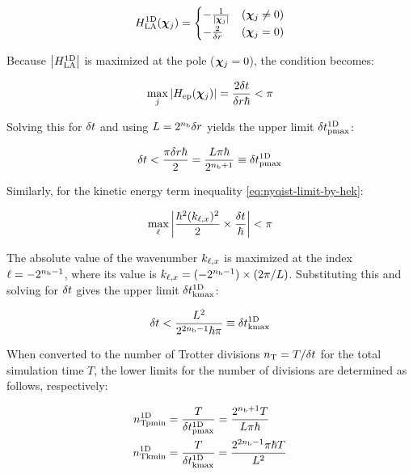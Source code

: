 \documentclass[report_2025.tex]{subfiles}
\begin{document}
\begin{equation}
H_{\mathrm{LA}}^{\mathrm{1D}}(\bm{\chi}_{j}) = \begin{cases}
-\frac{1}{{\left| \bm{\chi}_{j} \right|}} & (\bm{\chi}_{j}\neq0) \\
-\frac{2}{\delta r} & (\bm{\chi}_{j}=0)
\end{cases}
\end{equation}

Because ${\left| H_{\mathrm{LA}}^{\mathrm{1D}} \right|}$ is maximized at the pole ($\bm{\chi}_{j}=0$), the condition becomes:

\begin{equation}
\max_{j}{\left| H_{\mathrm{ep}}(\bm{\chi}_{j}) \right|} = \frac{2\delta t}{\delta r\hbar}<\pi
\end{equation}

Solving this for $\delta t$ and using $L=2^{n_{\mathrm{b}}}\delta r$ yields the upper limit $\delta t_{\mathrm{pmax}}^{\mathrm{1D}}$:

\begin{equation}
\delta t < \frac{\pi\delta r\hbar}{2}=\frac{L\pi\hbar}{2^{n_{\mathrm{b}}+1}}\equiv\delta t_{\mathrm{pmax}}^{\mathrm{1D}}
 \label{eq:nyqist-limit-by-hep-final}
\end{equation}

Similarly, for the kinetic energy term inequality \eqref{eq:nyqist-limit-by-hek}:

\begin{equation}
\max_{\ell}{\left| \frac{\hbar^2(k_{\ell,x})^2}{2}\times\frac{\delta t}{\hbar} \right|} < \pi
\label{eq:nyqist-limit-by-hek-maximum}
\end{equation}

The absolute value of the wavenumber $k_{\ell,x}$ is maximized at the index $\ell =
-2^{n_{\mathrm{b}}-1}$, where its value is $k_{\ell,x} = (-2^{n_{\mathrm{b}}-1})\times(2\pi/L)$.
Substituting this and solving for $\delta t$ gives the upper limit
$\delta t_{\mathrm{kmax}}^{\mathrm{1D}}$:

\begin{equation}
\delta t < \frac{L^2}{2^{2n_{\mathrm{b}}-1}\hbar\pi}\equiv\delta t_{\mathrm{kmax}}^{\mathrm{1D}}
 \label{eq:nyqist-limit-by-hek-final}
\end{equation}

When converted to the number of Trotter divisions $n_{\mathrm{T}} = T/\delta t$ for the
total simulation time $T$, the lower limits for the number of divisions are
determined as follows, respectively:

\begin{align}
    n_{\mathrm{Tpmin}}^{\mathrm{1D}} &= \frac{T}{\delta t_{\mathrm{pmax}}^{\mathrm{1D}}}=\frac{2^{n_{\mathrm{b}}+1}T}{L\pi\hbar}
    \label{eq:nT-pmin-definition}\\
    n_{\mathrm{Tkmin}}^{\mathrm{1D}} &= \frac{T}{\delta t_{\mathrm{kmax}}^{\mathrm{1D}}}=\frac{2^{2n_{\mathrm{b}}-1}\pi\hbar T}{L^2}
    \label{eq:nT-kmin-definition}
\end{align}
\end{document}
